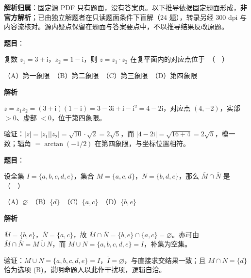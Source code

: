 

\begin{gknotice}
\textbf{解析归属}：固定源 PDF 只有题面，没有答案页。以下推导依据固定题面形成，\textbf{非官方解析}；已由独立解题者在只读题面条件下盲解（24 题），转录另经 300 dpi 与内容流核对。源内疑点保留在题面与答案要点中，不以推导结果反改原题。
\end{gknotice}

\begin{answer}

\textbf{题目}：

复数 $z_1 = 3 + \mathrm{i}$，$z_2 = 1 - \mathrm{i}$，则 $z = z_1 \cdot z_2$ 在复平面内的对应点位于　（　）

（A）第一象限　（B）第二象限　（C）第三象限　（D）第四象限

\textbf{解析}

$z=z_1z_2=(3+\mathrm i)(1-\mathrm i)=3-3\mathrm i+\mathrm i-\mathrm i^2=4-2\mathrm i$，对应点 $(4,-2)$，实部 $>0$、虚部 $<0$，位于第四象限。

验证：$|z|=|z_1||z_2|=\sqrt{10}\cdot\sqrt2=2\sqrt5$，而 $|4-2\mathrm i|=\sqrt{16+4}=2\sqrt5$，模一致；辐角 $=\arctan(-1/2)$ 在第四象限，与坐标位置相符。


\end{answer}
\begin{answer}

\textbf{题目}：

设全集 $I = \{a, b, c, d, e\}$，集合 $M = \{a, c, d\}$，$N = \{b, d, e\}$，那么 $\overline{M} \cap \overline{N}$ 是　（　）

（A）$\varnothing$　（B）$\{d\}$　（C）$\{a, c\}$　（D）$\{b, e\}$

\textbf{解析}

$\overline M=\{b,e\}$，$\overline N=\{a,c\}$，故 $\overline M\cap\overline N=\{b,e\}\cap\{a,c\}=\varnothing$。亦可由 $\overline M\cap\overline N=\overline{M\cup N}$，而 $M\cup N=\{a,b,c,d,e\}=I$，补集为空集。

验证：$M\cup N=\{a,b,c,d,e\}=I$，$\overline I=\varnothing$，与直接求交结果一致；且 $M\cap N=\{d\}$ 恰为选项 (B)，说明命题人以此作干扰项，逻辑自洽。


\end{answer}
